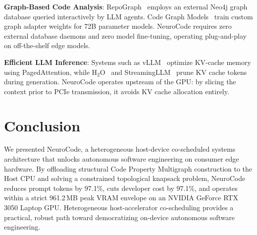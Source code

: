 \documentclass{article}
\begin{document}
\textbf{Graph-Based Code Analysis}: RepoGraph~\cite{repograph2025} employs an external Neo4j graph database queried interactively by LLM agents. Code Graph Models~\cite{codegraph2025} train custom graph adapter weights for 72B parameter models. NeuroCode requires zero external database daemons and zero model fine-tuning, operating plug-and-play on off-the-shelf edge models.

\textbf{Efficient LLM Inference}: Systems such as vLLM~\cite{kwon2023vllm} optimize KV-cache memory using PagedAttention, while H$_2$O~\cite{zhang2023h2o} and StreamingLLM~\cite{xiao2024streamingllm} prune KV cache tokens during generation. NeuroCode operates upstream of the GPU: by slicing the context prior to PCIe transmission, it avoids KV cache allocation entirely.

\section{Conclusion}
\label{sec:conclusion}

We presented NeuroCode, a heterogeneous host-device co-scheduled systems architecture that unlocks autonomous software engineering on consumer edge hardware. By offloading structural Code Property Multigraph construction to the Host CPU and solving a constrained topological knapsack problem, NeuroCode reduces prompt tokens by 97.1\%, cuts developer cost by 97.1\%, and operates within a strict 961.2\,MB peak VRAM envelope on an NVIDIA GeForce RTX 3050 Laptop GPU. Heterogeneous host-accelerator co-scheduling provides a practical, robust path toward democratizing on-device autonomous software engineering.



\end{document}
